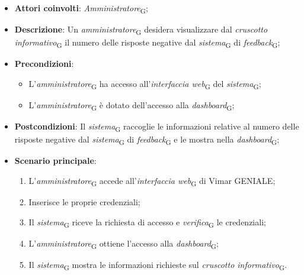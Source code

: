 \begin{itemize}
    \item \textbf{Attori coinvolti}: \textit{Amministratore}\textsubscript{G};
    \item \textbf{Descrizione}: Un \textit{amministratore}\textsubscript{G} desidera visualizzare dal \textit{cruscotto informativo}\textsubscript{G} il numero delle risposte negative dal \textit{sistema}\textsubscript{G} di \textit{feedback}\textsubscript{G};
    \item \textbf{Precondizioni}: 
        \begin{itemize}
            \item L’\textit{amministratore}\textsubscript{G} ha accesso all’\textit{interfaccia web}\textsubscript{G} del \textit{sistema}\textsubscript{G};
            \item L’\textit{amministratore}\textsubscript{G} è dotato dell’accesso alla \textit{dashboard}\textsubscript{G};
        \end{itemize}
    \item \textbf{Postcondizioni}: Il \textit{sistema}\textsubscript{G} raccoglie le informazioni relative al numero delle risposte negative dal \textit{sistema}\textsubscript{G} di \textit{feedback}\textsubscript{G} e le mostra nella \textit{dashboard}\textsubscript{G};
    \item \textbf{Scenario principale}:
    \begin{enumerate}
    \item L’\textit{amministratore}\textsubscript{G} accede all’\textit{interfaccia web}\textsubscript{G} di Vimar GENIALE;
    \item Inserisce le proprie credenziali;
    \item Il \textit{sistema}\textsubscript{G} riceve la richiesta di accesso e \textit{verifica}\textsubscript{G} le credenziali;
    \item L’\textit{amministratore}\textsubscript{G} ottiene l’accesso alla \textit{dashboard}\textsubscript{G};
    \item Il \textit{sistema}\textsubscript{G} mostra le informazioni richieste sul \textit{cruscotto informativo}\textsubscript{G}.
    \end{enumerate}
\end{itemize}



